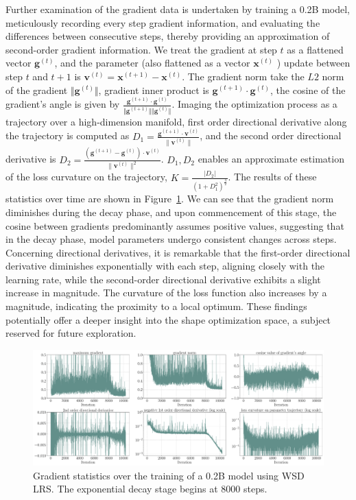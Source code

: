 Further examination of the gradient data is undertaken by training a 0.2B model, meticulously recording every step gradient information, and evaluating the differences between consecutive steps, thereby providing an approximation of second-order gradient information. We treat the gradient at step $t$ as a flattened vector $\mathbf{g}^{(t)}$, and the parameter (also flattened as a vector $\mathbf{x}^{(t)}$ ) update between step $t$ and $t+1$ is $\mathbf{v}^{(t)} = \mathbf{x}^{(t+1)} - \mathbf{x}^{(t)}$. The gradient norm take the $L2$ norm of the gradient $\Vert\mathbf{g}^{(t)} \Vert$, gradient inner product is $\mathbf{g}^{(t+1)} \cdot \mathbf{g}^{(t)}$, the cosine of the gradient's angle is given by $\frac{\mathbf{g}^{(t+1)} \cdot \mathbf{g}^{(t)}}  {\Vert\mathbf{g}^{(t+1)} \Vert \Vert\mathbf{g}^{(t)} \Vert}$. Imaging the optimization process as a trajectory over a high-dimension manifold, first order directional derivative along the trajectory is computed as $D_1 = \frac{\mathbf{g}^{(t+1)} \cdot \mathbf{v}^{(t)}}{\|\mathbf{v}^{(t)}\|}
$, and the second order directional derivative is $D_2 = \frac{(\mathbf{g}^{(t+1)} - \mathbf{g}^{(t)}) \cdot \mathbf{v}^{(t)}}{\|\mathbf{v}^{(t)}\|^2}
$. $D_1, D_2$ enables an approximate estimation of the loss curvature on the trajectory, $K = \frac{|D_2|}{(1 + D_1^2)^{\frac{3}{2}}}$. The results of these statistics over time are shown in Figure~\ref{fig:grad}. We can see that the gradient norm diminishes during the decay phase, and upon commencement of this stage, the cosine between gradients predominantly assumes positive values, suggesting that in the decay phase, model parameters undergo consistent changes across steps. Concerning directional derivatives, it is remarkable that the first-order directional derivative diminishes exponentially with each step, aligning closely with the learning rate, while the second-order directional derivative exhibits a slight increase in magnitude. The curvature of the loss function also increases by a magnitude, indicating the proximity to a local optimum. These findings potentially offer a deeper insight into the shape optimization space, a subject reserved for future exploration.


\begin{figure}[htbp]
    \centering
        \centering
        \includegraphics[width=1.0\linewidth]{Fig/grad.pdf}
     \caption{Gradient statistics over the training of a 0.2B model using WSD LRS. The exponential decay stage begins at 8000 steps.}
        \label{fig:grad}
\end{figure}



